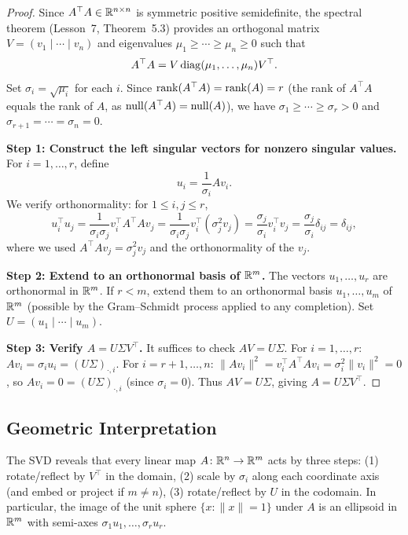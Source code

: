 \documentclass[11pt,a4paper]{article}
\begin{document}
\begin{proof}
Since $A^\top A \in \mathbb{R}^{n \times n}$ is symmetric positive semidefinite,
the spectral theorem (Lesson~7, Theorem~5.3) provides an orthogonal
matrix $V = (v_1 \mid \cdots \mid v_n)$ and eigenvalues
$\mu_1 \geq \cdots \geq \mu_n \geq 0$ such that
\[
  A^\top A = V \operatorname{diag}(\mu_1, \ldots, \mu_n) V^\top.
\]
Set $\sigma_i = \sqrt{\mu_i}$ for each $i$.  Since
$\operatorname{rank}(A^\top A) = \operatorname{rank}(A) = r$ (the rank of $A^\top A$ equals the
rank of $A$, as $\operatorname{null}(A^\top A) = \operatorname{null}(A)$), we have
$\sigma_1 \geq \cdots \geq \sigma_r > 0$ and
$\sigma_{r+1} = \cdots = \sigma_n = 0$.

\textbf{Step 1: Construct the left singular vectors for nonzero
singular values.}  For $i = 1, \ldots, r$, define
\[
  u_i = \frac{1}{\sigma_i} A v_i.
\]
We verify orthonormality: for $1 \leq i, j \leq r$,
\[
  u_i^\top u_j = \frac{1}{\sigma_i \sigma_j} v_i^\top A^\top A v_j
  = \frac{1}{\sigma_i \sigma_j} v_i^\top (\sigma_j^2 v_j)
  = \frac{\sigma_j}{\sigma_i} v_i^\top v_j
  = \frac{\sigma_j}{\sigma_i} \delta_{ij} = \delta_{ij},
\]
where we used $A^\top A v_j = \sigma_j^2 v_j$ and the orthonormality
of the $v_j$.

\textbf{Step 2: Extend to an orthonormal basis of $\mathbb{R}^m$.}
The vectors $u_1, \ldots, u_r$ are orthonormal in $\mathbb{R}^m$.  If $r < m$,
extend them to an orthonormal basis $u_1, \ldots, u_m$ of $\mathbb{R}^m$
(possible by the Gram--Schmidt process applied to any completion).
Set $U = (u_1 \mid \cdots \mid u_m)$.

\textbf{Step 3: Verify $A = U\Sigma V^\top$.}  It suffices to check
$AV = U\Sigma$.  For $i = 1, \ldots, r$:
$Av_i = \sigma_i u_i = (U\Sigma)_{\cdot, i}$.
For $i = r+1, \ldots, n$: $\|Av_i\|^2 = v_i^\top A^\top A v_i
= \sigma_i^2 \|v_i\|^2 = 0$, so $Av_i = 0 = (U\Sigma)_{\cdot, i}$
(since $\sigma_i = 0$).  Thus $AV = U\Sigma$, giving
$A = U\Sigma V^\top$.
\end{proof}

\subsection{Geometric Interpretation}

The SVD reveals that every linear map $A\colon \mathbb{R}^n \to \mathbb{R}^m$ acts
by three steps: (1) rotate/reflect by $V^\top$ in the domain, (2) scale
by $\sigma_i$ along each coordinate axis (and embed or project if
$m \neq n$), (3) rotate/reflect by $U$ in the codomain.  In particular,
the image of the unit sphere $\{x : \|x\| = 1\}$ under $A$ is an
ellipsoid in $\mathbb{R}^m$ with semi-axes $\sigma_1 u_1, \ldots, \sigma_r u_r$.
\end{document}

